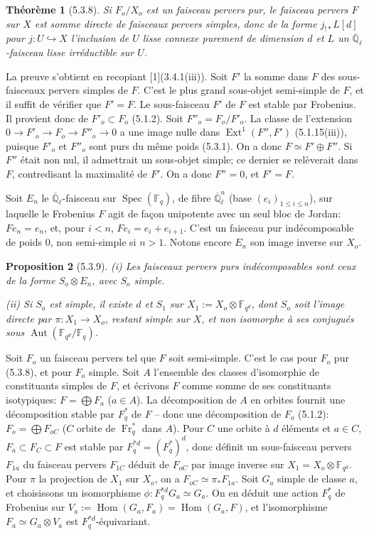 \documentclass[12pt,a4paper]{article}
\theoremstyle{plain}
\newtheorem{theorem}{Th\'eor\`eme}[section]
\newtheorem{proposition}[theorem]{Proposition}
\theoremstyle{definition}
\theoremstyle{remark}
\DeclareMathOperator{\Hom}{Hom}
\DeclareMathOperator{\Ext}{Ext}
\DeclareMathOperator{\Aut}{Aut}
\DeclareMathOperator{\Spec}{Spec}
\DeclareMathOperator{\Fr}{Fr}
\newcommand{\FF}{\mathbb{F}}
\newcommand{\QQ}{\mathbb{Q}}
\begin{document}
\begin{theorem}[5.3.8]
Si $F_o/X_o$ est un faisceau pervers pur, le faisceau pervers $F$ sur $X$ est somme directe de faisceaux pervers simples, donc de la forme $j_{!*}L[d]$ pour $j: U \hookrightarrow X$ l'inclusion de $U$ lisse connexe purement de dimension $d$ et $L$ un $\overline{\QQ}_{\ell}$-faisceau lisse irr\'eductible sur $U$.
\end{theorem}

La preuve s'obtient en recopiant [1](3.4.1(iii)). Soit $F'$ la somme dans $F$ des sous-faisceaux pervers simples de $F$. C'est le plus grand sous-objet semi-simple de $F$, et il suffit de v\'erifier que $F' = F$. Le sous-faisceau $F'$ de $F$ est stable par Frobenius. Il provient donc de $F'_o \subset F_o$ (5.1.2). Soit $F''_o = F_o/F'_o$. La classe de l'extension $0 \to F'_o \to F_o \to F''_o \to 0$ a une image nulle dans $\Ext^1(F'', F')$ (5.1.15(iii)), puisque $F'_o$ et $F''_o$ sont purs du m\^eme poids (5.3.1). On a donc $F \simeq F' \oplus F''$. Si $F''$ \'etait non nul, il admettrait un sous-objet simple; ce dernier se rel\`everait dans $F$, contredisant la maximalit\'e de $F'$. On a donc $F'' = 0$, et $F' = F$.

Soit $E_n$ le $\overline{\QQ}_{\ell}$-faisceau sur $\Spec(\FF_q)$, de fibre $\overline{\QQ}_{\ell}^n$ (base $(e_i)_{1 \leq i \leq n}$), sur laquelle le Frobenius $F$ agit de fa\c{c}on unipotente avec un seul bloc de Jordan: $Fe_n = e_n$, et, pour $i < n$, $Fe_i = e_i + e_{i+1}$. C'est un faisceau pur ind\'ecomposable de poids $0$, non semi-simple si $n > 1$. Notons encore $E_n$ son image inverse sur $X_o$.

\begin{proposition}[5.3.9]
(i) Les faisceaux pervers purs ind\'ecomposables sont ceux de la forme $S_o \otimes E_n$, avec $S_o$ simple.

(ii) Si $S_o$ est simple, il existe $d$ et $S_1$ sur $X_1 := X_o \otimes \FF_{q^d}$, dont $S_o$ soit l'image directe par $\pi: X_1 \to X_o$, restant simple sur $X$, et non isomorphe \`a ses conjugu\'es sous $\Aut(\FF_{q^d}/\FF_q)$.
\end{proposition}

Soit $F_o$ un faisceau pervers tel que $F$ soit semi-simple. C'est le cas pour $F_o$ pur (5.3.8), et pour $F_o$ simple. Soit $A$ l'ensemble des classes d'isomorphie de constituants simples de $F$, et \'ecrivons $F$ comme somme de ses constituants isotypiques: $F = \bigoplus F_a$ ($a \in A$). La d\'ecomposition de $A$ en orbites fournit une d\'ecomposition stable par $F^*_q$ de $F$ -- donc une d\'ecomposition de $F_o$ (5.1.2): $F_o = \bigoplus F_{oC}$ ($C$ orbite de $\Fr_q^*$ dans $A$). Pour $C$ une orbite \`a $d$ \'el\'ements et $a \in C$, $F_a \subset F_C \subset F$ est stable par $F^{*d}_q = (F^*_q)^d$, donc d\'efinit un sous-faisceau pervers $F_{1a}$ du faisceau pervers $F_{1C}$ d\'eduit de $F_{oC}$ par image inverse sur $X_1 = X_o \otimes \FF_{q^d}$. Pour $\pi$ la projection de $X_1$ sur $X_o$, on a $F_{oC} \simeq \pi_*F_{1a}$. Soit $G_a$ simple de classe $a$, et choisissons un isomorphisme $\phi: F^{*d}_q G_a \simeq G_a$. On en d\'eduit une action $F^*_q$ de Frobenius sur $V_a := \Hom(G_a, F_a) = \Hom(G_a, F)$, et l'isomorphisme $F_a \simeq G_a \otimes V_a$ est $F^{*d}_q$-\'equivariant.
\end{document}
